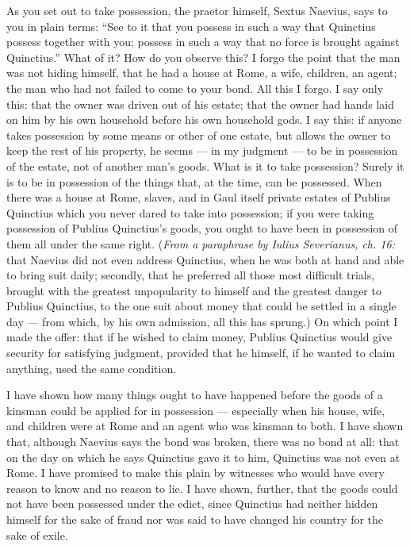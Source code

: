  As you set out to take possession, the praetor himself, Sextus Naevius, says to you in plain terms: ``See to it that you possess in such a way that Quinctius possess together with you; possess in such a way that no force is brought against Quinctius.'' What of it? How do you observe this? I forgo the point that the man was not hiding himself, that he had a house at Rome, a wife, children, an agent; the man who had not failed to come to your bond. All this I forgo. I say only this: that the owner was driven out of his estate; that the owner had hands laid on him by his own household before his own household gods. I say this: if anyone takes possession by some means or other of one estate, but allows the owner to keep the rest of his property, he seems --- in my judgment --- to be in possession of the estate, not of another man's goods. What is it to take possession? Surely it is to be in possession of the things that, at the time, can be possessed. When there was a house at Rome, slaves, and in Gaul itself private estates of Publius Quinctius which you never dared to take into possession; if you were taking possession of Publius Quinctius's goods, you ought to have been in possession of them all under the same right. (\textit{From a paraphrase by Iulius Severianus, ch. 16:} that Naevius did not even address Quinctius, when he was both at hand and able to bring suit daily; secondly, that he preferred all those most difficult trials, brought with the greatest unpopularity to himself and the greatest danger to Publius Quinctius, to the one suit about money that could be settled in a single day --- from which, by his own admission, all this has sprung.) On which point I made the offer: that if he wished to claim money, Publius Quinctius would give security for satisfying judgment, provided that he himself, if he wanted to claim anything, used the same condition.

 I have shown how many things ought to have happened before the goods of a kinsman could be applied for in possession --- especially when his house, wife, and children were at Rome and an agent who was kinsman to both. I have shown that, although Naevius says the bond was broken, there was no bond at all: that on the day on which he says Quinctius gave it to him, Quinctius was not even at Rome. I have promised to make this plain by witnesses who would have every reason to know and no reason to lie. I have shown, further, that the goods could not have been possessed under the edict, since Quinctius had neither hidden himself for the sake of fraud nor was said to have changed his country for the sake of exile.


